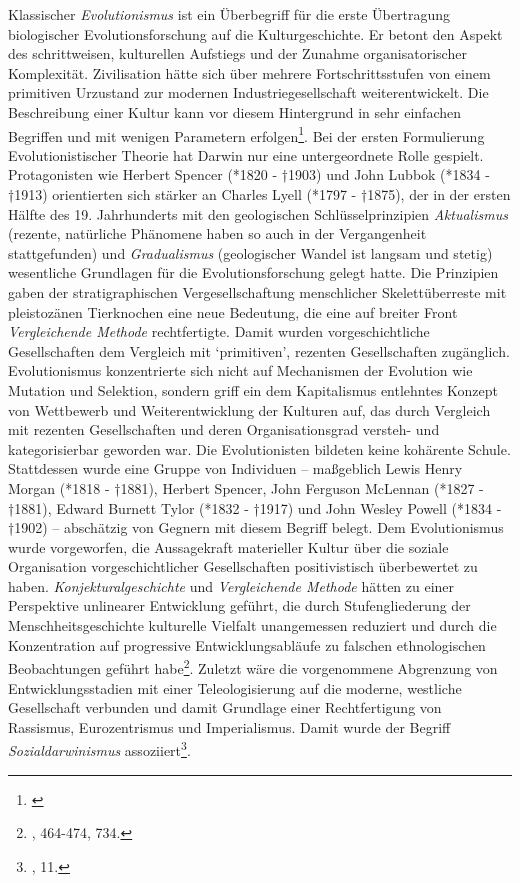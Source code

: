 \documentclass[openany,twoside,twocolumn]{book}
\let\rmarkdownfootnote\footnote%
\def\footnote{\protect\rmarkdownfootnote}
\begin{document}
Klassischer \emph{Evolutionismus} ist ein Überbegriff für die erste
Übertragung biologischer Evolutionsforschung auf die Kulturgeschichte.
Er betont den Aspekt des schrittweisen, kulturellen Aufstiegs und der
Zunahme organisatorischer Komplexität. Zivilisation hätte sich über
mehrere Fortschrittsstufen von einem primitiven Urzustand zur modernen
Industriegesellschaft weiterentwickelt. Die Beschreibung einer Kultur
kann vor diesem Hintergrund in sehr einfachen Begriffen und mit wenigen
Parametern erfolgen\footnote{\textcite{noauthor_evolutionismus_1986}}.
Bei der ersten Formulierung Evolutionistischer Theorie hat Darwin nur
eine untergeordnete Rolle gespielt. Protagonisten wie Herbert Spencer
(*1820 - †1903) und John Lubbok (*1834 - †1913) orientierten sich
stärker an Charles Lyell (*1797 - †1875), der in der ersten Hälfte des
19. Jahrhunderts mit den geologischen Schlüsselprinzipien
\emph{Aktualismus} (rezente, natürliche Phänomene haben so auch in der
Vergangenheit stattgefunden) und \emph{Gradualismus} (geologischer
Wandel ist langsam und stetig) wesentliche Grundlagen für die
Evolutionsforschung gelegt hatte. Die Prinzipien gaben der
stratigraphischen Vergesellschaftung menschlicher Skelettüberreste mit
pleistozänen Tierknochen eine neue Bedeutung, die eine auf breiter Front
\emph{Vergleichende Methode} rechtfertigte. Damit wurden
vorgeschichtliche Gesellschaften dem Vergleich mit `primitiven',
rezenten Gesellschaften zugänglich. Evolutionismus konzentrierte sich
nicht auf Mechanismen der Evolution wie Mutation und Selektion, sondern
griff ein dem Kapitalismus entlehntes Konzept von Wettbewerb und
Weiterentwicklung der Kulturen auf, das durch Vergleich mit rezenten
Gesellschaften und deren Organisationsgrad versteh- und kategorisierbar
geworden war. Die Evolutionisten bildeten keine kohärente Schule.
Stattdessen wurde eine Gruppe von Individuen -- maßgeblich Lewis Henry
Morgan (*1818 - †1881), Herbert Spencer, John Ferguson McLennan (*1827 -
†1881), Edward Burnett Tylor (*1832 - †1917) und John Wesley Powell
(*1834 - †1902) -- abschätzig von Gegnern mit diesem Begriff belegt. Dem
Evolutionismus wurde vorgeworfen, die Aussagekraft materieller Kultur
über die soziale Organisation vorgeschichtlicher Gesellschaften
positivistisch überbewertet zu haben. \emph{Konjekturalgeschichte} und
\emph{Vergleichende Methode} hätten zu einer Perspektive unlinearer
Entwicklung geführt, die durch Stufengliederung der
Menschheitsgeschichte kulturelle Vielfalt unangemessen reduziert und
durch die Konzentration auf progressive Entwicklungsabläufe zu falschen
ethnologischen Beobachtungen geführt habe\footnote{\textcite{petermann_geschichte_2004},
  464-474, 734.}. Zuletzt wäre die vorgenommene Abgrenzung von
Entwicklungsstadien mit einer Teleologisierung auf die moderne,
westliche Gesellschaft verbunden und damit Grundlage einer
Rechtfertigung von Rassismus, Eurozentrismus und Imperialismus. Damit
wurde der Begriff \emph{Sozialdarwinismus} assoziiert\footnote{\textcite{ShennanGenesmemeshuman2002},
  11.}.
\end{document}
